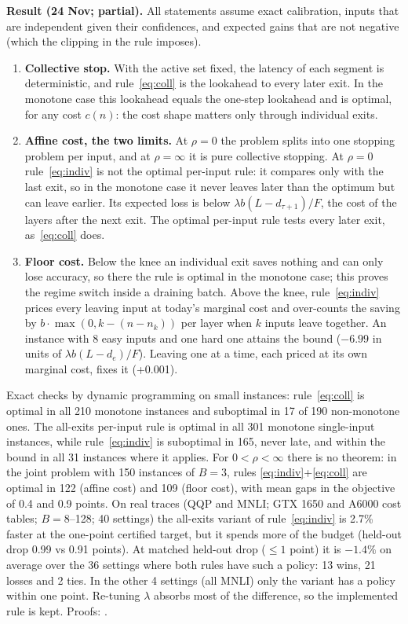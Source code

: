 \textbf{Result (24 Nov; partial).} All statements assume exact calibration, inputs that are independent given their
confidences, and expected gains that are not negative (which the clipping in the rule imposes).
\begin{enumerate}
  \item \textbf{Collective stop.} With the active set fixed, the latency of each segment is deterministic, and
  rule~\eqref{eq:coll} is the lookahead to every later exit. In the monotone case this lookahead equals the one-step
  lookahead and is optimal, for any cost $c(n)$: the cost shape matters only through individual exits.
  \item \textbf{Affine cost, the two limits.} At $\rho=0$ the problem splits into one stopping problem per input,
  and at $\rho=\infty$ it is pure collective stopping. At $\rho=0$ rule~\eqref{eq:indiv} is not the optimal
  per-input rule: it compares only with the last exit, so in the monotone case it never leaves later than the
  optimum but can leave earlier. Its expected loss is below $\lambda b(L-d_{\tau+1})/F$, the cost of the layers after
  the next exit. The optimal per-input rule tests every later exit, as~\eqref{eq:coll} does.
  \item \textbf{Floor cost.} Below the knee an individual exit saves nothing and can only lose accuracy, so there the
  rule is optimal in the monotone case; this proves the regime switch inside a draining batch. Above the knee,
  rule~\eqref{eq:indiv} prices every leaving input at today's marginal cost and over-counts the saving by
  $b\cdot\max(0,k-(n-n_k))$ per layer when $k$ inputs leave together. An instance with 8 easy inputs and one hard one
  attains the bound ($-6.99$ in units of $\lambda b(L-d_e)/F$). Leaving one at a time, each priced at its own
  marginal cost, fixes it (+0.001).
\end{enumerate}
Exact checks by dynamic programming on small instances: rule~\eqref{eq:coll} is optimal in all 210 monotone
instances and suboptimal in 17 of 190 non-monotone ones. The all-exits per-input rule is optimal in all 301 monotone
single-input instances, while rule~\eqref{eq:indiv} is suboptimal in 165, never late, and within the bound in all 31
instances where it applies. For $0<\rho<\infty$ there is no theorem: in the joint problem with 150 instances of
$B=3$, rules \eqref{eq:indiv}+\eqref{eq:coll} are optimal in 122 (affine cost) and 109 (floor cost), with mean gaps
in the objective of 0.4 and 0.9 points. On real traces (QQP and MNLI; GTX 1650 and A6000 cost tables; $B=8$--128; 40
settings) the all-exits variant of rule~\eqref{eq:indiv} is 2.7\% faster at the one-point certified target, but it
spends more of the budget (held-out drop 0.99 vs 0.91 points). At matched held-out drop ($\le1$ point) it is $-1.4\%$
on average over the 36 settings where both rules have such a policy: 13 wins, 21 losses and 2 ties. In the other 4
settings (all MNLI) only the variant has a policy within one point. Re-tuning $\lambda$ absorbs most of the
difference, so the implemented rule is kept.
Proofs: .

